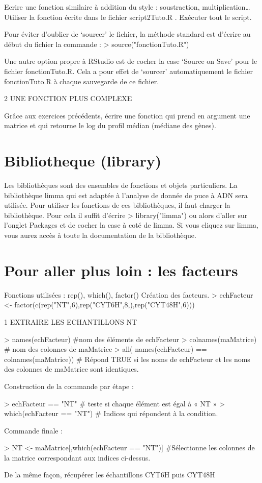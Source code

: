 \documentclass[a4paper]{article}
\begin{document}
Ecrire une fonction similaire à addition du style : soustraction, multiplication…
Utiliser la fonction écrite dans le fichier script2Tuto.R .
Exécuter tout le script.

Pour éviter d'oublier de ‘sourcer' le fichier, la méthode standard est d'écrire au début du fichier la commande  :
> source("fonctionTuto.R")

Une autre option propre à RStudio est de cocher la case ‘Source on Save' pour le fichier fonctionTuto.R. Cela a pour effet de ‘sourcer' automatiquement le fichier fonctionTuto.R à chaque sauvegarde de ce fichier.

2	UNE FONCTION PLUS COMPLEXE

Grâce aux exercices précédents, écrire une fonction qui prend en argument une matrice  et qui retourne le log du profil médian (médiane des gènes).















\section{Bibliotheque (library)}
Les bibliothèques sont des ensembles de fonctions et objets particuliers. La bibliothèque limma qui est adaptée à l'analyse de donnée de puce à ADN sera utilisée.
Pour utiliser les fonctions de ces bibliothèques, il faut charger la bibliothèque. Pour cela il suffit d'écrire
> library("limma")
ou alors d'aller sur l'onglet Packages et de cocher la case à coté de limma. Si vous cliquez sur limma, vous aurez accès à toute la documentation de la bibliothèque.

\section{Pour aller plus loin : les facteurs}
Fonctions utilisées : 
 rep(), which(), factor()
Création des facteurs.
> echFacteur <- factor(c(rep("NT",6),rep("CYT6H",8,),rep("CYT48H",6)))

1	EXTRAIRE LES ECHANTILLONS NT

> names(echFacteur) \#nom des éléments de echFacteur
> colnames(maMatrice) \# nom des colonnes de maMatrice
> all( names(echFacteur) == colnames(maMatrice)) \# Répond TRUE si les noms de echFacteur et les noms des colonnes de maMatrice sont identiques. 

Construction de la commande par étape :

> echFacteur == "NT"  \# teste si chaque élément est égal à « NT »
> which(echFacteur == "NT") \# Indices qui répondent à la condition.

Commande finale :

> NT <- maMatrice[,which(echFacteur == "NT")] \#Sélectionne les colonnes de la matrice correspondant aux indices ci-dessus.

De la même façon, récupérer les échantillons CYT6H puis CYT48H
\end{document}
